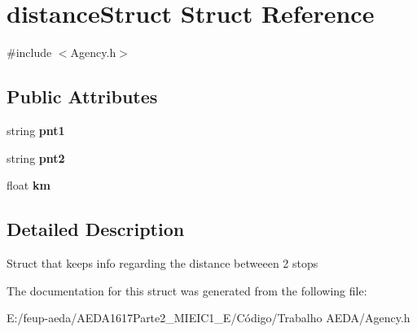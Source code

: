\hypertarget{structdistance_struct}{}\section{distance\+Struct Struct Reference}
\label{structdistance_struct}


{\ttfamily \#include $<$Agency.\+h$>$}

\subsection*{Public Attributes}
\begin{DoxyCompactItemize}
\item 
string {\bfseries pnt1}
\item 
string {\bfseries pnt2}
\item 
float {\bfseries km}
\end{DoxyCompactItemize}


\subsection{Detailed Description}
Struct that keeps info regarding the distance betweeen 2 stops 

The documentation for this struct was generated from the following file\+:\begin{DoxyCompactItemize}
\item 
E\+:/feup-\/aeda/\+A\+E\+D\+A1617\+Parte2\+\_\+M\+I\+E\+I\+C1\+\_\+\+E/\+Código/\+Trabalho A\+E\+D\+A/Agency.\+h\end{DoxyCompactItemize}
